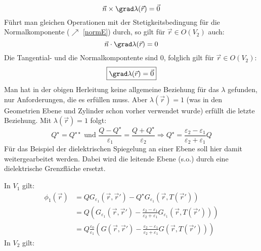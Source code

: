 		  	\begin{equation}
		  		{\vec{n}\times\grad \lambda(\vec{r} ) = \vec{0}}
		  	\end{equation}
		  	 Führt man gleichen Operationen mit der Stetigkeitsbedingung für die Normalkomponente ($\nearrow$ \ref{normE}) durch, so gilt für $\vec{r} \in O(V_2)$ auch:
		  	\begin{equation}
		  		{\vec{n}\cdot\grad \lambda(\vec{r} ) = 0}
		  	\end{equation}
		  	 Die Tangential- und die Normalkompontente sind 0, folglich gilt für $\vec{r} \in O(V_2)$:
		  	\begin{equation}
		  		\boxed{\grad \lambda(\vec{r} ) = \vec{0}}
		  	\end{equation}
		  	Man hat in der obigen Herleitung keine allgemeine Beziehung für das $\lambda$ gefunden, nur Anforderungen, die es erfüllen muss. Aber $\lambda (\vec{r} ) = 1$ (was in den Geometrien Ebene und Zylinder schon vorher verwendet wurde) erfüllt die letzte Beziehung. Mit $\lambda (\vec{r} ) = 1$ folgt:
		  	\begin{equation}
		  		Q^\star = Q^{\star\star} \text{ und } \frac{Q-Q^\star}{\varepsilon_1} = \frac{Q+Q^{\star}}{\varepsilon_2} \Rightarrow \boxed{Q^\star = \frac{\varepsilon_2-\varepsilon_1}{\varepsilon_2+\varepsilon_1} Q}
		  	\end{equation} 
		  Für das Beispiel der dielektrischen Spiegelung an einer Ebene soll hier damit weitergearbeitet werden. Dabei wird die leitende Ebene (s.o.) durch eine dielektrische Grenzfläche ersetzt.
		  	\begin{center}
		  		
		  	\end{center}
		  		 In $V_1$ gilt:
		  		\begin{equation}\label{spiegdielekt1}\begin{split}
		  				\phi_1(\vec{r} ) & = Q G_{\varepsilon_1}(\vec{r} , \vec{r}' ) -  Q^\star G_{\varepsilon_1}(\vec{r} , T(\vec{r}' ))\\
		  				& = Q\left( G_{\varepsilon_1}(\vec{r} , \vec{r}' ) -  \frac{\varepsilon_2-\varepsilon_1}{\varepsilon_2+\varepsilon_1} G_{\varepsilon_1}(\vec{r} , T(\vec{r}' ))\right)\\
		  				& = Q\frac{\varepsilon_0}{\varepsilon_1}\left( G(\vec{r} , \vec{r}' ) -  \frac{\varepsilon_2-\varepsilon_1}{\varepsilon_2+\varepsilon_1} G(\vec{r} , T(\vec{r}' ))\right)
		  		\end{split}\end{equation}
		  		 In $V_2$ gilt:
